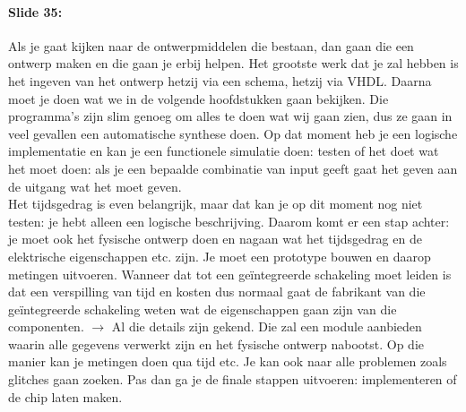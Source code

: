 \documentclass[10pt,a4paper]{book}
\begin{document}
\paragraph{Slide 35:} Als je gaat kijken naar de ontwerpmiddelen die bestaan, dan gaan die een ontwerp maken en die gaan je erbij helpen. Het grootste werk dat je zal hebben is het ingeven van het ontwerp hetzij via een schema, hetzij via VHDL. Daarna moet je doen wat we in de volgende hoofdstukken gaan bekijken. Die programma's zijn slim genoeg om alles te doen wat wij gaan zien, dus ze gaan in veel gevallen een automatische synthese doen. Op dat moment heb je een logische implementatie en kan je een functionele simulatie doen: testen of het doet wat het moet doen: als je een bepaalde combinatie van input geeft gaat het geven aan de uitgang wat het moet geven.\\
Het tijdsgedrag is even belangrijk, maar dat kan je op dit moment nog niet testen: je hebt alleen een logische beschrijving. Daarom komt er een stap achter: je moet ook het fysische ontwerp doen en nagaan wat het tijdsgedrag en de elektrische eigenschappen etc. zijn. Je moet een prototype bouwen en daarop metingen uitvoeren. Wanneer dat tot een ge\"integreerde schakeling moet leiden is dat een verspilling van tijd en kosten dus normaal gaat de fabrikant van die ge\"integreerde schakeling weten wat de eigenschappen gaan zijn van die componenten. $\rightarrow$ Al die details zijn gekend. Die zal een module aanbieden waarin alle gegevens verwerkt zijn en het fysische ontwerp nabootst. Op die manier kan je metingen doen qua tijd etc. Je kan ook naar alle problemen zoals glitches gaan zoeken. Pas dan ga je de finale stappen uitvoeren: implementeren of de chip laten maken. 
\end{document}
